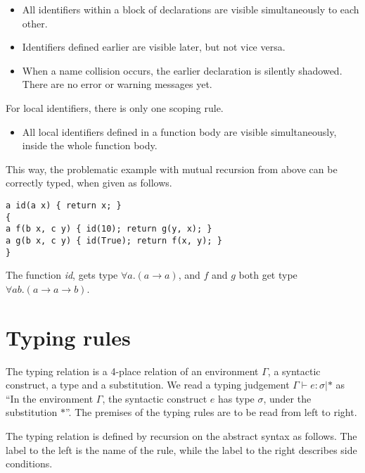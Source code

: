 \documentclass[a4paper]{article}
\newcommand{\arr}{\rightarrow}
\newcommand{\oftype}[2]{#1\!:\!#2}
\begin{document}
\begin{itemize}

  \item All identifiers within a block of declarations are visible
  simultaneously to each other.

  \item Identifiers defined earlier are visible later, but not vice versa.

  \item When a name collision occurs, the earlier declaration is silently
  shadowed.  There are no error or warning messages yet.

\end{itemize}

For local identifiers, there is only one scoping rule.

\begin{itemize}

  \item All local identifiers defined in a function body are visible
  simultaneously, inside the whole function body.

\end{itemize}

This way, the problematic example with mutual recursion from above can be
correctly typed, when given as follows.

\begin{verbatim}
a id(a x) { return x; }
{
a f(b x, c y) { id(10); return g(y, x); }
a g(b x, c y) { id(True); return f(x, y); }
}
\end{verbatim}

The function \emph{id}, gets type $\forall a .  (a \arr a)$, and $f$ and $g$
both get type $\forall a b . (a \arr a \arr b)$.


\section{Typing rules}

The typing relation is a 4-place relation of an environment $\Gamma$, a
syntactic construct, a type and a substitution.  We read a typing judgement
$\Gamma \vdash \oftype{e}{\sigma} | *$ as ``In the environment $\Gamma$, the
syntactic construct $e$ has type $\sigma$, under the substitution $*$''.  The
premises of the typing rules are to be read from left to right.

The typing relation is defined by recursion on the abstract syntax as follows.
The label to the left is the name of the rule, while the label to the right
describes side conditions.
\end{document}
